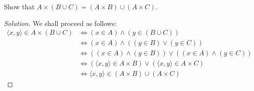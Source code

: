 \documentclass{article}
\newenvironment{solution}{\begin{proof}[Solution]}{\end{proof}}
\newcommand{\pr}[1]{\left( {#1} \right)}
\newcommand{\brc}[1]{ \left\{  {#1} \right\}}
\newcommand{\ang}[1]{\langle {#1} \rangle}
\begin{document}
	\setcounter{subsection}{2}
	\begin{ahw}
		Show that $A \times \pr{B \cup C} = \pr{A \times B} \cup \pr{A \times C}$.
	\end{ahw}
	\begin{solution}
		\begin{comment}
			Let us denote $X = A$ and $Y = B \cup C$ so that it's clearer.
			
			Then, we observe the following:
			\begin{align*}
				x \in A \times \pr{B \cup C} &\iff x \in \brc{t : \exists A \exists \pr{B \cup C}\pr{a \in A \land b \in \pr{B \cup C} \land t \in \ang{a,b}}} \\
				&\iff x \in \brc{t : \exists A \exists B \exists C \pr{a \in A \land (b \in B \lor c \in C) \land t \in \ang{a,b}}} \\
				&\iff x \in \brc{t : \exists A \exists B \exists C \pr{ \pr{a \in A \land b \in B \land t \in \ang{a,b}} \lor \pr{a \in A \land c \in C \land t \in \ang{a,c}}}} \\
				&\iff x \in \brc{t : \exists A \exists B (a \in A \land b \in B \land t \in \ang{a,b})} \lor x \in \brc{t : \exists A \exists C (a \in A \land c \in C \land t \in \ang{a,c})}
				&\iff x \in \pr{A \times B} \cup \pr{A \times C}
			\end{align*}
		\end{comment}
		We shall proceed as follows:
		\begin{align*}
			\ang{x,y} \in A \times (B \cup C) &\iff (x \in A) \land (y \in \pr{B \cup C}) \\
			&\iff (x \in A) \land \pr{(y \in B) \lor (y \in C)} \\
			&\iff \pr{(x \in A) \land (y \in B)} \lor \pr{(x \in A) \land (y \in C)} \\
			&\iff (\ang{x,y} \in A \times B) \lor \pr{\ang{x,y} \in A \times C} \\
			&\iff \ang{x,y} \in \pr{A \times B} \cup \pr{A \times C}
		\end{align*}
	\end{solution}
	
\end{document}
